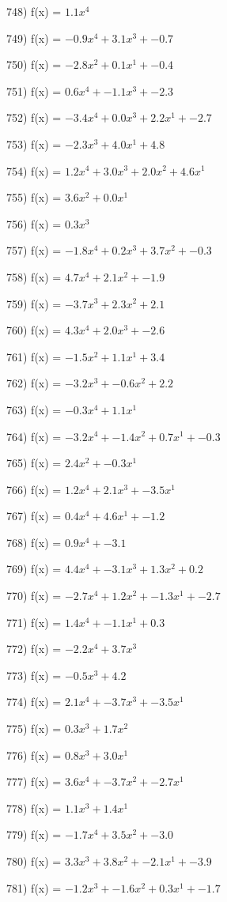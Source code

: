 \documentclass[10pt,a4paper]{article}
\begin{document}
748) f(x) = $1.1x^4$

749) f(x) = $-0.9x^4 + 3.1x^3 + -0.7$

750) f(x) = $-2.8x^2 + 0.1x^1 + -0.4$

751) f(x) = $0.6x^4 + -1.1x^3 + -2.3$

752) f(x) = $-3.4x^4 + 0.0x^3 + 2.2x^1 + -2.7$

753) f(x) = $-2.3x^3 + 4.0x^1 + 4.8$

754) f(x) = $1.2x^4 + 3.0x^3 + 2.0x^2 + 4.6x^1$

755) f(x) = $3.6x^2 + 0.0x^1$

756) f(x) = $0.3x^3$

757) f(x) = $-1.8x^4 + 0.2x^3 + 3.7x^2 + -0.3$

758) f(x) = $4.7x^4 + 2.1x^2 + -1.9$

759) f(x) = $-3.7x^3 + 2.3x^2 + 2.1$

760) f(x) = $4.3x^4 + 2.0x^3 + -2.6$

761) f(x) = $-1.5x^2 + 1.1x^1 + 3.4$

762) f(x) = $-3.2x^3 + -0.6x^2 + 2.2$

763) f(x) = $-0.3x^4 + 1.1x^1$

764) f(x) = $-3.2x^4 + -1.4x^2 + 0.7x^1 + -0.3$

765) f(x) = $2.4x^2 + -0.3x^1$

766) f(x) = $1.2x^4 + 2.1x^3 + -3.5x^1$

767) f(x) = $0.4x^4 + 4.6x^1 + -1.2$

768) f(x) = $0.9x^4 + -3.1$

769) f(x) = $4.4x^4 + -3.1x^3 + 1.3x^2 + 0.2$

770) f(x) = $-2.7x^4 + 1.2x^2 + -1.3x^1 + -2.7$

771) f(x) = $1.4x^4 + -1.1x^1 + 0.3$

772) f(x) = $-2.2x^4 + 3.7x^3$

773) f(x) = $-0.5x^3 + 4.2$

774) f(x) = $2.1x^4 + -3.7x^3 + -3.5x^1$

775) f(x) = $0.3x^3 + 1.7x^2$

776) f(x) = $0.8x^3 + 3.0x^1$

777) f(x) = $3.6x^4 + -3.7x^2 + -2.7x^1$

778) f(x) = $1.1x^3 + 1.4x^1$

779) f(x) = $-1.7x^4 + 3.5x^2 + -3.0$

780) f(x) = $3.3x^3 + 3.8x^2 + -2.1x^1 + -3.9$

781) f(x) = $-1.2x^3 + -1.6x^2 + 0.3x^1 + -1.7$
\end{document}
